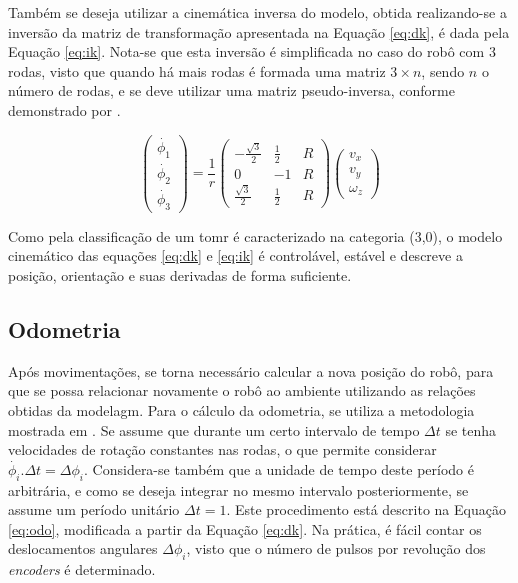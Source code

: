 Também se deseja utilizar a cinemática inversa do modelo, obtida realizando-se a inversão da matriz de transformação apresentada na Equação \ref{eq:dk}, é dada pela Equação \ref{eq:ik}. Nota-se que esta inversão é simplificada no caso do robô com 3 rodas, visto que quando há mais rodas é formada uma matriz $3 \times n$, sendo $n$ o número de rodas, e se deve utilizar uma matriz pseudo-inversa, conforme demonstrado por \citet{rojas2006holonomic}.

\begin{equation}
  \begin{pmatrix}
    \dot{\phi_1} \\
    \dot{\phi_2} \\
    \dot{\phi_3}
  \end{pmatrix}
  =
  \frac{1}{r}
  \begin{pmatrix}
    -\frac{\sqrt{3}}{2} & \frac{1}{2} & R \\
    0                   & -1          & R \\
    \frac{\sqrt{3}}{2}  & \frac{1}{2} & R
  \end{pmatrix}
  \begin{pmatrix}
    v_x \\
    v_y \\
    \omega_z
  \end{pmatrix}
  \label{eq:ik}
\end{equation}

Como pela classificação de \citet{campion1996structural} um \acrshort{tomr} é caracterizado na categoria (3,0), o modelo cinemático das equações \ref{eq:dk} e \ref{eq:ik} é controlável, estável e descreve a posição, orientação e suas derivadas de forma suficiente. %

\subsection{Odometria}

Após movimentações, se torna necessário calcular a nova posição do robô, para que se possa relacionar novamente o robô ao ambiente utilizando as relações obtidas da modelagm. Para o cálculo da odometria, se utiliza a metodologia mostrada em \citet{lynch2017modern}. Se assume que durante um certo intervalo de tempo $\Delta t$ se tenha velocidades de rotação constantes nas rodas, o que permite considerar $\dot{\phi_i}.\Delta t = \Delta \phi_i$. Considera-se também que a unidade de tempo deste período é arbitrária, e como se deseja integrar no mesmo intervalo posteriormente, se assume um período unitário $\Delta t = 1$. Este procedimento está descrito na Equação \ref{eq:odo}, modificada a partir da Equação \ref{eq:dk}. Na prática, é fácil contar os deslocamentos angulares $\Delta \phi_i$, visto que o número de pulsos por revolução dos \textit{encoders} é determinado.

